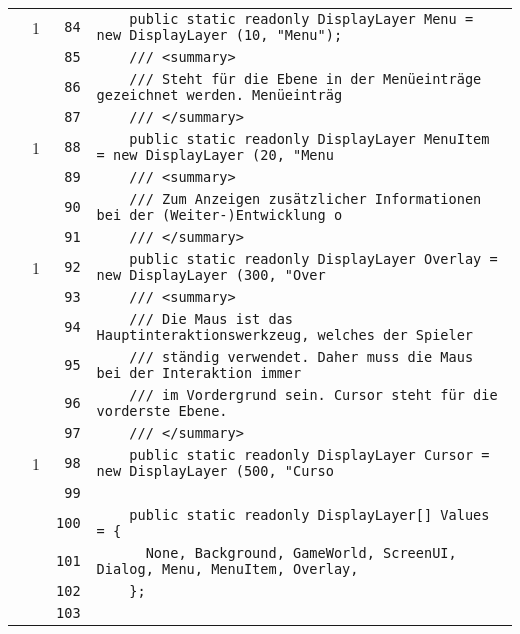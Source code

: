 \documentclass[a4paper,10pt]{article}
\begin{document}
\begin{longtable}[l]{lrrl}
\cellcolor{green} & 1 & \verb~84~ & \verb~    public static readonly DisplayLayer Menu = new DisplayLayer (10, "Menu");~\\
\cellcolor{gray} &  & \verb~85~ & \verb~    /// <summary>~\\
\cellcolor{gray} &  & \verb~86~ & \verb~    /// Steht für die Ebene in der Menüeinträge gezeichnet werden. Menüeinträg~\\
\cellcolor{gray} &  & \verb~87~ & \verb~    /// </summary>~\\
\cellcolor{green} & 1 & \verb~88~ & \verb~    public static readonly DisplayLayer MenuItem = new DisplayLayer (20, "Menu~\\
\cellcolor{gray} &  & \verb~89~ & \verb~    /// <summary>~\\
\cellcolor{gray} &  & \verb~90~ & \verb~    /// Zum Anzeigen zusätzlicher Informationen bei der (Weiter-)Entwicklung o~\\
\cellcolor{gray} &  & \verb~91~ & \verb~    /// </summary>~\\
\cellcolor{green} & 1 & \verb~92~ & \verb~    public static readonly DisplayLayer Overlay = new DisplayLayer (300, "Over~\\
\cellcolor{gray} &  & \verb~93~ & \verb~    /// <summary>~\\
\cellcolor{gray} &  & \verb~94~ & \verb~    /// Die Maus ist das Hauptinteraktionswerkzeug, welches der Spieler~\\
\cellcolor{gray} &  & \verb~95~ & \verb~    /// ständig verwendet. Daher muss die Maus bei der Interaktion immer~\\
\cellcolor{gray} &  & \verb~96~ & \verb~    /// im Vordergrund sein. Cursor steht für die vorderste Ebene.~\\
\cellcolor{gray} &  & \verb~97~ & \verb~    /// </summary>~\\
\cellcolor{green} & 1 & \verb~98~ & \verb~    public static readonly DisplayLayer Cursor = new DisplayLayer (500, "Curso~\\
\cellcolor{gray} &  & \verb~99~ & \verb~~\\
\cellcolor{gray} &  & \verb~100~ & \verb~    public static readonly DisplayLayer[] Values = {~\\
\cellcolor{gray} &  & \verb~101~ & \verb~      None, Background, GameWorld, ScreenUI, Dialog, Menu, MenuItem, Overlay, ~\\
\cellcolor{gray} &  & \verb~102~ & \verb~    };~\\
\cellcolor{gray} &  & \verb~103~ & \verb~~\\

\end{longtable}
\end{document}
